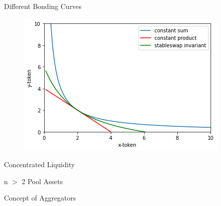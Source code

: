 \documentclass[]{beamer}
\begin{document}
\begin{frame}{Different Bonding Curves}
\begin{figure}
	\includegraphics[scale=0.6]{../assets/images/bonding-curves.png}
\end{figure}
%    
%    
%  
%
%  
%
%
\end{frame}


\begin{frame}{Concentrated Liquidity}

\end{frame}


\begin{frame}{n $>$ 2 Pool Assets}

\end{frame}


\begin{frame}{Concept of Aggregators}

\end{frame}
\end{document}
